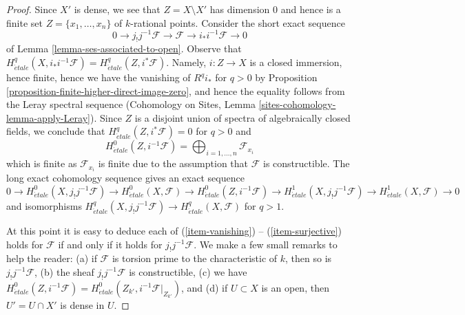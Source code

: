 \documentclass[10pt,a4paper]{amsart}
\theoremstyle{plain}
\theoremstyle{definition}
\theoremstyle{remark}
\numberwithin{equation}{subsection}
\def\etale{{\acute{e}tale}}
\begin{document}
\begin{proof}
Since $X'$ is dense, we see that $Z = X \setminus X'$ has dimension $0$
and hence is a finite set $Z = \{x_1, \ldots, x_n\}$ of $k$-rational points.
Consider the short exact sequence
$$
0 \to j_!j^{-1}\mathcal{F} \to \mathcal{F} \to i_*i^{-1}\mathcal{F} \to 0
$$
of Lemma \ref{lemma-ses-associated-to-open}. Observe that
$H^q_\etale(X, i_*i^{-1}\mathcal{F}) = H^q_\etale(Z, i^*\mathcal{F})$.
Namely, $i : Z \to X$ is a closed immersion, hence finite,
hence we have the vanishing of $R^qi_*$ for $q > 0$ by
Proposition \ref{proposition-finite-higher-direct-image-zero}, and
hence the equality follows from the Leray spectral sequence
(Cohomology on Sites, Lemma \ref{sites-cohomology-lemma-apply-Leray}).
Since $Z$ is a disjoint union of spectra of algebraically closed
fields, we conclude that $H^q_\etale(Z, i^*\mathcal{F}) = 0$
for $q > 0$ and
$$
H^0_\etale(Z, i^{-1}\mathcal{F}) =
\bigoplus\nolimits_{i = 1, \ldots, n} \mathcal{F}_{x_i}
$$
which is finite as $\mathcal{F}_{x_i}$ is finite due to the
assumption that $\mathcal{F}$ is constructible.
The long exact cohomology sequence gives an exact sequence
$$
0 \to
H^0_\etale(X, j_!j^{-1}\mathcal{F}) \to
H^0_\etale(X, \mathcal{F}) \to
H^0_\etale(Z, i^{-1}\mathcal{F}) \to
H^1_\etale(X, j_!j^{-1}\mathcal{F}) \to
H^1_\etale(X, \mathcal{F}) \to 0
$$
and isomorphisms $H^q_\etale(X, j_!j^{-1}\mathcal{F}) \to
H^q_\etale(X, \mathcal{F})$ for $q > 1$.

\medskip\noindent
At this point it is easy to deduce each of 
(\ref{item-vanishing}) -- (\ref{item-surjective})
holds for $\mathcal{F}$ if and only if it holds for
$j_!j^{-1}\mathcal{F}$. We make a few small remarks to help the reader:
(a) if $\mathcal{F}$ is torsion prime to the characteristic
of $k$, then so is $j_!j^{-1}\mathcal{F}$,
(b) the sheaf $j_!j^{-1}\mathcal{F}$ is constructible,
(c) we have $H^0_\etale(Z, i^{-1}\mathcal{F}) =
H^0_\etale(Z_{k'}, i^{-1}\mathcal{F}|_{Z_{k'}})$, and (d)
if $U \subset X$ is an open, then $U' = U \cap X'$ is dense in $U$.
\end{proof}
\end{document}

